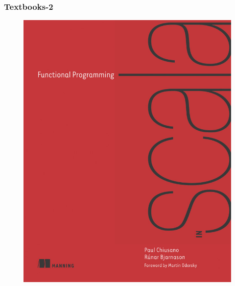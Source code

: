 \begin{frame}[c]
\begin{figure}[ht]
\begin{minipage}[c][1\width]{
				0.4\textwidth}
	\end{minipage}
\end{figure}
\end{frame}

\begin{frame}[c]
\frametitle{Textbooks-2}

\begin{figure}[ht]
	\begin{minipage}[c][1\width]{0.3\textwidth}
		\centering
		\includegraphics[width=.9\linewidth,height=.7\textheight]{./Figures/chapter-00/bjarnason.png}
	\end{minipage}
	\hfill
	\begin{minipage}[c][1\width]{0.3\textwidth}
		\centering

\end{minipage}
\end{figure}
\end{frame}

